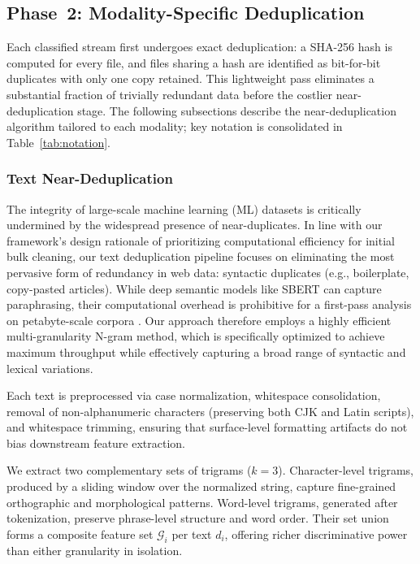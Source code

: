 \documentclass[sigconf, nonacm]{acmart}
\begin{document}
\subsection{Phase~2: Modality-Specific Deduplication}

Each classified stream first undergoes exact deduplication: a SHA-256 hash is computed for every file, and files sharing a hash are identified as bit-for-bit duplicates with only one copy retained. This lightweight pass eliminates a substantial fraction of trivially redundant data before the costlier near-deduplication stage. The following subsections describe the near-deduplication algorithm tailored to each modality; key notation is consolidated in Table~\ref{tab:notation}.

\subsubsection{Text Near-Deduplication}

The integrity of large-scale machine learning (ML) datasets is critically undermined by the widespread presence of near-duplicates. In line with our framework's design rationale of prioritizing computational efficiency for initial bulk cleaning, our text deduplication pipeline focuses on eliminating the most pervasive form of redundancy in web data: syntactic duplicates (e.g., boilerplate, copy-pasted articles). While deep semantic models like SBERT \cite{reimers2019sentencebertsentenceembeddingsusing} can capture paraphrasing, their computational overhead is prohibitive for a first-pass analysis on petabyte-scale corpora \cite{lee2022deduplicating}. Our approach therefore employs a highly efficient multi-granularity N-gram method, which is specifically optimized to achieve maximum throughput while effectively capturing a broad range of syntactic and lexical variations.

Each text is preprocessed via case normalization, whitespace consolidation, removal of non-alphanumeric characters (preserving both CJK and Latin scripts), and whitespace trimming, ensuring that surface-level formatting artifacts do not bias downstream feature extraction.

We extract two complementary sets of trigrams ($k{=}3$). Character-level trigrams, produced by a sliding window over the normalized string, capture fine-grained orthographic and morphological patterns. Word-level trigrams, generated after tokenization, preserve phrase-level structure and word order. Their set union forms a composite feature set $\mathcal{G}_i$ per text $d_i$, offering richer discriminative power than either granularity in isolation.
\end{document}
